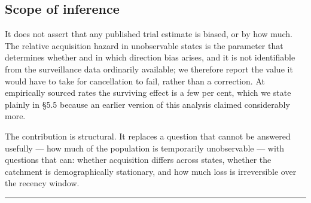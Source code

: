 \subsection{Scope of inference}

It does not assert that any published trial estimate is biased, or by how much. The relative acquisition hazard in unobservable states is the parameter that determines whether and in which direction bias arises, and it is not identifiable from the surveillance data ordinarily available; we therefore report the value it would have to take for cancellation to fail, rather than a correction. At empirically sourced rates the surviving effect is a few per cent, which we state plainly in §5.5 because an earlier version of this analysis claimed considerably more.

The contribution is structural. It replaces a question that cannot be answered usefully --- how much of the population is temporarily unobservable --- with questions that can: whether acquisition differs across states, whether the catchment is demographically stationary, and how much loss is irreversible over the recency window.

\begin{center}\rule{0.5\linewidth}{0.5pt}\end{center}
